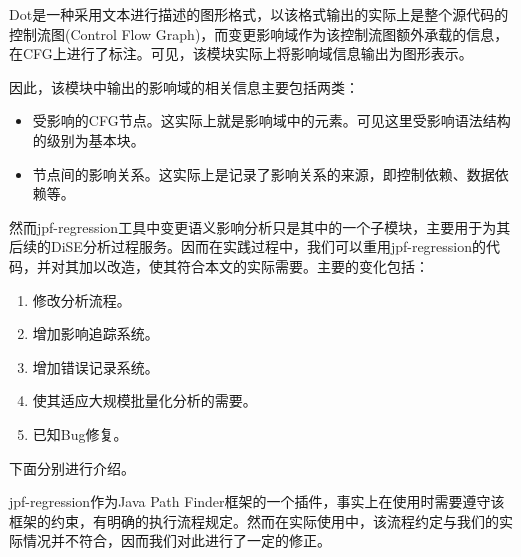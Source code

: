 Dot是一种采用文本进行描述的图形格式，以该格式输出的实际上是整个源代码的控制流图(Control Flow Graph)，而变更影响域作为该控制流图额外承载的信息，在CFG上进行了标注。可见，该模块实际上将影响域信息输出为图形表示。

因此，该模块中输出的影响域的相关信息主要包括两类：
\begin{itemize}
	\item 受影响的CFG节点。这实际上就是影响域中的元素。可见这里受影响语法结构的级别为基本块。
	\item 节点间的影响关系。这实际上是记录了影响关系的来源，即控制依赖、数据依赖等。
\end{itemize}

%



然而jpf-regression工具中变更语义影响分析只是其中的一个子模块，主要用于为其后续的DiSE分析过程服务。因而在实践过程中，我们可以重用jpf-regression的代码，并对其加以改造，使其符合本文的实际需要。主要的变化包括：
\begin{enumerate}
	\item 修改分析流程。
	\item 增加影响追踪系统。
	\item 增加错误记录系统。
	\item 使其适应大规模批量化分析的需要。
	\item 已知Bug修复。
\end{enumerate}

下面分别进行介绍。

jpf-regression作为Java Path Finder框架的一个插件，事实上在使用时需要遵守该框架的约束，有明确的执行流程规定。然而在实际使用中，该流程约定与我们的实际情况并不符合，因而我们对此进行了一定的修正。

